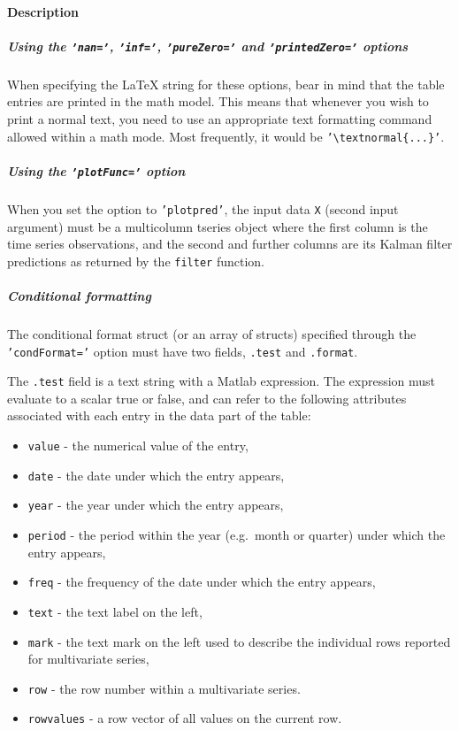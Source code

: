\paragraph{Description}

\subparagraph{Using the \texttt{'nan='}, \texttt{'inf='},
\texttt{'pureZero='} and \texttt{'printedZero='}
options}

When specifying the LaTeX string for these options, bear in mind that
the table entries are printed in the math model. This means that
whenever you wish to print a normal text, you need to use an appropriate
text formatting command allowed within a math mode. Most frequently, it
would be \texttt{'\textbackslash{}textnormal\{...\}'}.

\subparagraph{Using the \texttt{'plotFunc='}
option}

When you set the option to \texttt{'plotpred'}, the input data
\texttt{X} (second input argument) must be a multicolumn tseries object
where the first column is the time series observations, and the second
and further columns are its Kalman filter predictions as returned by the
\texttt{filter} function.

\subparagraph{Conditional formatting}

The conditional format struct (or an array of structs) specified through
the \texttt{'condFormat='} option must have two fields, \texttt{.test}
and \texttt{.format}.

The \texttt{.test} field is a text string with a Matlab expression. The
expression must evaluate to a scalar true or false, and can refer to the
following attributes associated with each entry in the data part of the
table:

\begin{itemize}
\itemsep1pt\parskip0pt
\item
  \texttt{value} - the numerical value of the entry,
\item
  \texttt{date} - the date under which the entry appears,
\item
  \texttt{year} - the year under which the entry appears,
\item
  \texttt{period} - the period within the year (e.g.~month or quarter)
  under which the entry appears,
\item
  \texttt{freq} - the frequency of the date under which the entry
  appears,
\item
  \texttt{text} - the text label on the left,
\item
  \texttt{mark} - the text mark on the left used to describe the
  individual rows reported for multivariate series,
\item
  \texttt{row} - the row number within a multivariate series.
\item
  \texttt{rowvalues} - a row vector of all values on the current row.
\end{itemize}

